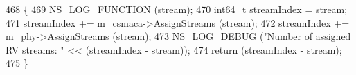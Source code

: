 \begin{DoxyCode}
468 \{
469   \hyperlink{log-macros-disabled_8h_a90b90d5bad1f39cb1b64923ea94c0761}{NS\_LOG\_FUNCTION} (stream);
470   int64\_t streamIndex = stream;
471   streamIndex += \hyperlink{classns3_1_1LrWpanNetDevice_adf20b42f2fc813649c641cdd3d90e046}{m\_csmaca}->AssignStreams (stream);
472   streamIndex += \hyperlink{classns3_1_1LrWpanNetDevice_a78e6e248b53fe535e3a02c58615522a6}{m\_phy}->AssignStreams (stream);
473   \hyperlink{group__logging_ga413f1886406d49f59a6a0a89b77b4d0a}{NS\_LOG\_DEBUG} (\textcolor{stringliteral}{"Number of assigned RV streams:  "} << (streamIndex - stream));
474   \textcolor{keywordflow}{return} (streamIndex - stream);
475 \}
\end{DoxyCode}
